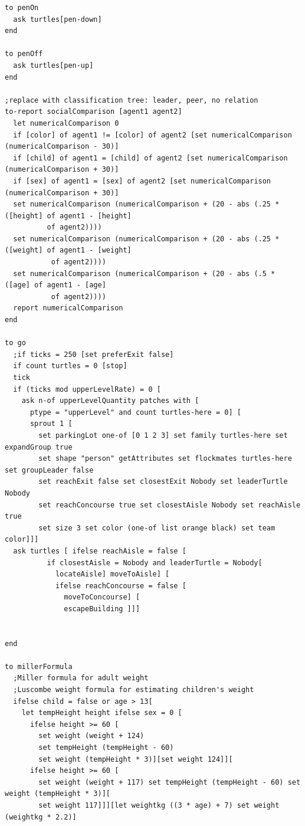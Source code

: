 \documentclass{article}
\begin{document}
\begin{lstlisting}
to penOn
  ask turtles[pen-down]
end

to penOff
  ask turtles[pen-up]
end

;replace with classification tree: leader, peer, no relation
to-report socialComparison [agent1 agent2]
  let numericalComparison 0
  if [color] of agent1 != [color] of agent2 [set numericalComparison (numericalComparison - 30)]
  if [child] of agent1 = [child] of agent2 [set numericalComparison (numericalComparison + 30)]
  if [sex] of agent1 = [sex] of agent2 [set numericalComparison (numericalComparison + 30)]
  set numericalComparison (numericalComparison + (20 - abs (.25 * ([height] of agent1 - [height] 
          of agent2))))
  set numericalComparison (numericalComparison + (20 - abs (.25 * ([weight] of agent1 - [weight]
           of agent2))))
  set numericalComparison (numericalComparison + (20 - abs (.5 * ([age] of agent1 - [age]
           of agent2))))
  report numericalComparison
end

to go
  ;if ticks = 250 [set preferExit false]
  if count turtles = 0 [stop]
  tick
  if (ticks mod upperLevelRate) = 0 [
    ask n-of upperLevelQuantity patches with [
      ptype = "upperLevel" and count turtles-here = 0] [
      sprout 1 [
        set parkingLot one-of [0 1 2 3] set family turtles-here set expandGroup true 
        set shape "person" getAttributes set flockmates turtles-here set groupLeader false 
        set reachExit false set closestExit Nobody set leaderTurtle Nobody 
        set reachConcourse true set closestAisle Nobody set reachAisle true 
        set size 3 set color (one-of list orange black) set team color]]]
  ask turtles [ ifelse reachAisle = false [  
          if closestAisle = Nobody and leaderTurtle = Nobody[
            locateAisle] moveToAisle] [
            ifelse reachConcourse = false [
              moveToConcourse] [
              escapeBuilding ]]]

 
end

to millerFormula
  ;Miller formula for adult weight
  ;Luscombe weight formula for estimating children's weight
  ifelse child = false or age > 13[
    let tempHeight height ifelse sex = 0 [
      ifelse height >= 60 [
        set weight (weight + 124) 
        set tempHeight (tempHeight - 60) 
        set weight (tempHeight * 3)][set weight 124]][
      ifelse height >= 60 [
        set weight (weight + 117) set tempHeight (tempHeight - 60) set weight (tempHeight * 3)][
        set weight 117]]][let weightkg ((3 * age) + 7) set weight (weightkg * 2.2)]
  


\end{lstlisting}
\end{document}
